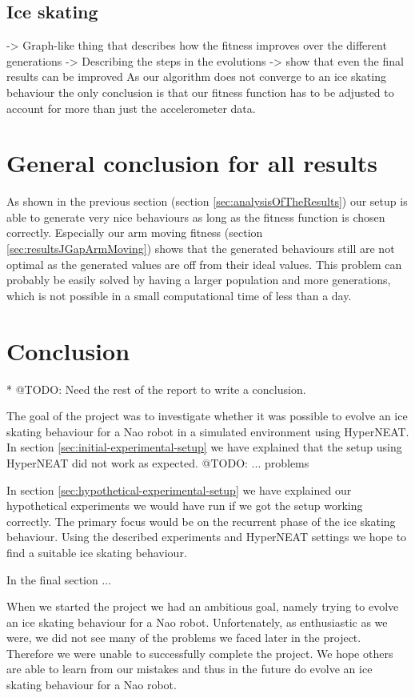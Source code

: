 \documentclass[a4paper,10pt]{article}
\begin{document}
\subsection{Ice skating}
-> Graph-like thing that describes how the fitness improves over the different generations
-> Describing the steps in the evolutions -> show that even the final results can be improved
As our algorithm does not converge to an ice skating behaviour the only conclusion is that our fitness function has to be adjusted to account for more than just the accelerometer data. 


\section{General conclusion for all results}
As shown in the previous section (section \ref{sec:analysisOfTheResults}) our setup is able to generate very nice behaviours as long as the fitness function is chosen correctly. Especially our arm moving fitness (section \ref{sec:resultsJGapArmMoving}) shows that the generated behaviours still are not optimal as the generated values are off from their ideal values. This problem can probably be easily solved by having a larger population and more generations, which is not possible in a small computational time of less than a day. 


\section{Conclusion}
\label{sec:conclusion}
* @TODO: Need the rest of the report to write a conclusion.

The goal of the project was to investigate whether it was possible to evolve an ice skating behaviour for a Nao robot in a simulated environment using HyperNEAT. In section \ref{sec:initial-experimental-setup} we have explained that the setup using HyperNEAT did not work as expected. @TODO: ... problems

In section \ref{sec:hypothetical-experimental-setup} we have explained our hypothetical experiments we would have run if we got the setup working correctly. The primary focus would be on the recurrent phase of the ice skating behaviour. Using the described experiments and HyperNEAT settings we hope to find a suitable ice skating behaviour.

In the final section ...

When we started the project we had an ambitious goal, namely trying to evolve an ice skating behaviour for a Nao robot. Unfortenately, as enthusiastic as we were, we did not see many of the problems we faced later in the project. Therefore we were unable to successfully complete the project. We hope others are able to learn from our mistakes and thus in the future do evolve an ice skating behaviour for a Nao robot.



\end{document}
